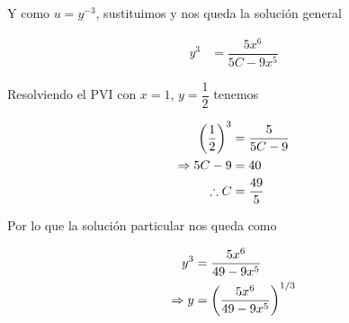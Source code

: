\begin{itemize}
    Y como $u=y^{-3}$, sustituimos y nos queda la solución general
    
    \begin{align}
        y^3&=\dfrac{5x^6}{5C-9x^5}
    \end{align}
       
       Resolviendo el PVI con $x=1$, $y=\dfrac{1}{2}$ tenemos
       
       \begin{align*}
           \left( \dfrac{1}{2} \right)^3&=\dfrac{5}{5C-9} \\
           \Rightarrow 5C-9&=40 \\
           \therefore C&=\dfrac{49}{5}
       \end{align*}
       
       Por lo que la solución particular nos queda como
       
       \begin{align*}
           y^3&=\dfrac{5x^6}{49-9x^5}\\
           \Rightarrow y&=\left( \dfrac{5x^6}{49-9x^5} \right)^{1/3}
       \end{align*}
       
       \begin{center}
       \end{center}
       
           
    
       
       
       
       
  
       

\end{itemize}
